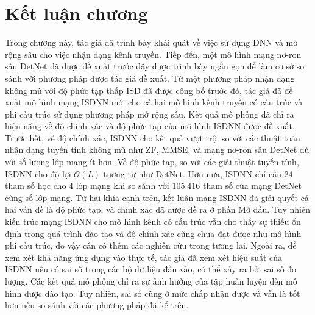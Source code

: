 \section{Kết luận chương}

Trong chương này, tác giả đã trình bày khái quát về việc sử dụng DNN và mở rộng sâu cho việc nhận dạng kênh truyền. Tiếp đến, một mô hình mạng nơ-ron sâu DetNet đã được đề xuất trước đây được trình bày ngắn gọn để làm cơ sở so sánh với phương pháp được tác giả đề xuất. Từ một phương pháp nhận dạng không mù với độ phức tạp thấp ISD đã được công bố trước đó, tác giả đã đề xuất mô hình mạng ISDNN mới cho cả hai mô hình kênh truyền có cấu trúc và phi cấu trúc sử dụng phương pháp mở rộng sâu. Kết quả mô phỏng đã chỉ ra hiệu năng về độ chính xác và độ phức tạp của mô hình ISDNN được đề xuất. Trước hết, về độ chính xác, ISDNN cho kết quả vượt trội so với các thuật toán nhận dạng tuyến tính không mù như ZF, MMSE, và mạng nơ-ron sâu DetNet dù với số lượng lớp mạng ít hơn. Về độ phức tạp, so với các giải thuật tuyến tính, ISDNN cho độ lợi $\mathcal{O}(L)$ tương tự như DetNet. Hơn nữa, ISDNN chỉ cần $24$ tham số học cho $4$ lớp mạng khi so sánh với $105.416$ tham số của mạng DetNet cùng số lớp mạng. Từ hai khía cạnh trên, kết luận mạng ISDNN đã giải quyết cả hai vấn đề là độ phức tạp, và chính xác đã được đề ra ở phần Mở đầu. Tuy nhiên kiến trúc mạng ISDNN cho mô hình kênh có cấu trúc vẫn cho thấy sự thiếu ổn định trong quá trình đào tạo và độ chính xác cũng chưa đạt được như mô hình phi cấu trúc, do vậy cần có thêm các nghiên cứu trong tương lai. Ngoài ra, để xem xét khả năng ứng dụng vào thực tế, tác giả đã xem xét hiệu suất của ISDNN nếu có sai số trong các bộ dữ liệu đầu vào, có thể xảy ra bởi sai số đo lượng. Các kết quả mô phỏng chỉ ra sự ảnh hưởng của tập huấn luyện đến mô hình được đào tạo. Tuy nhiên, sai số cũng ở mức chấp nhận được và vẫn là tốt hơn nếu so sánh với các phương pháp đã kể trên. 